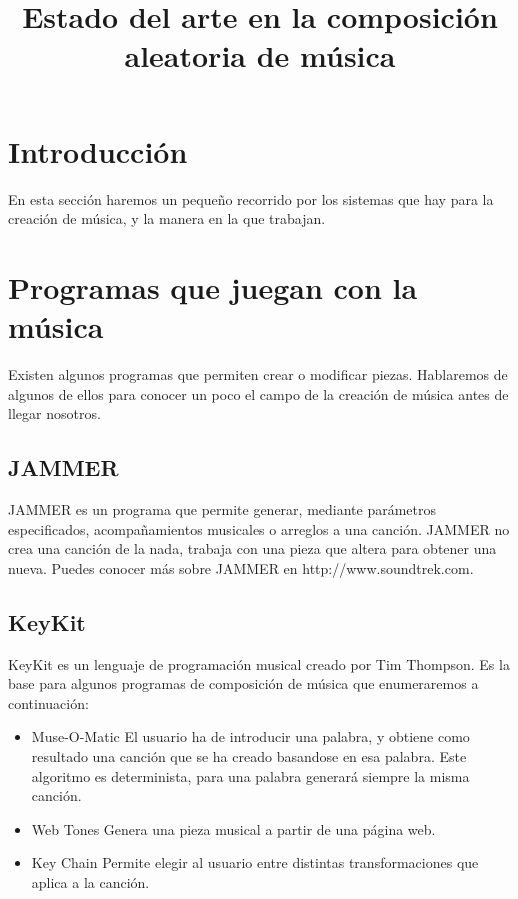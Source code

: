 \documentclass[a4paper,11pt]{article}
\title{Estado del arte en la composici\'on aleatoria de m\'usica}
\begin{document}
\maketitle
\tableofcontents
\section{Introducci\'on}

En esta secci\'on haremos un peque\~no recorrido por los sistemas que hay para la creaci\'on de m\'usica, y la manera en la que trabajan.

\section{Programas que juegan con la m\'usica}

Existen algunos programas que permiten crear o modificar  piezas. Hablaremos de algunos de ellos para conocer un poco el campo de la creaci\'on de m\'usica antes de llegar nosotros.

\subsection{JAMMER}

JAMMER es un programa que permite generar, mediante par\'ametros especificados, acompa\~namientos musicales o arreglos a una canci\'on. JAMMER no crea una canci\'on de la nada, trabaja con una pieza que altera para obtener una nueva.
Puedes conocer m\'as sobre JAMMER en http://www.soundtrek.com.

\subsection {KeyKit}

KeyKit es un lenguaje de programaci\'on musical creado por Tim Thompson. Es la base para algunos programas de composici\'on de m\'usica que enumeraremos a continuaci\'on:

\begin {itemize}

\item [Muse-O-Matic] El usuario ha de introducir una palabra, y obtiene como resultado una canci\'on que se ha creado basandose en esa palabra. Este algoritmo es determinista, para una palabra generar\'a siempre la misma canci\'on.
\item [Web Tones] Genera una pieza musical a partir de una p\'agina web. 
\item [Key Chain] Permite elegir al usuario entre distintas transformaciones que aplica a la canci\'on.

\end {itemize}
\end{document}
